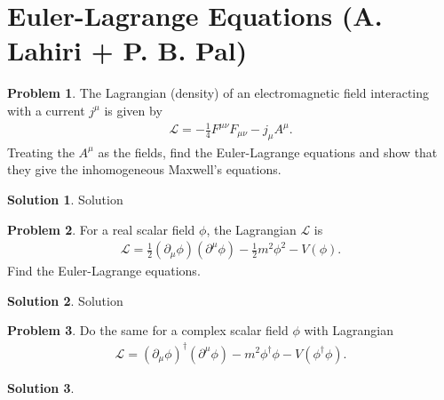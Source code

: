 \documentclass{book}
\numberwithin{equation}{section}
\theoremstyle{definition}
\newtheorem{prob}{Problem}[section]
\newtheorem{sln}{Solution}[section]
\newcommand{\p}{\partial}
\newcommand{\lag}{\mathcal{L}}
\begin{document}
\newpage


\section{Euler-Lagrange Equations (A. Lahiri + P. B. Pal)}

\begin{prob}
	The Lagrangian (density) of an electromagnetic field interacting with a current $j^\mu$ is given by
	\begin{align}
	\lag = -\frac{1}{4}F^{\mu\nu}F_{\mu\nu} - j_\mu A^\mu.
	\end{align}
	Treating the $A^\mu$ as the fields, find the Euler-Lagrange equations and show that they give the inhomogeneous Maxwell's equations.\\
	
	\begin{sln}
		Solution
	\end{sln}
\end{prob}






\newpage

\begin{prob}
	For a real scalar field $\phi$, the Lagrangian $\lag$ is 
	\begin{align}
	\lag = \frac{1}{2}(\p_\mu\phi)(\p^\mu\phi) - \frac{1}{2}m^2\phi^2 - V(\phi).
	\end{align}
	Find the Euler-Lagrange equations.\\
	
	\begin{sln}
		Solution
	\end{sln}
\end{prob}



\newpage




\begin{prob}
	Do the same for a complex scalar field $\phi$ with Lagrangian
	\begin{align}
	\lag = (\p_\mu\phi)^\dagger(\p^\mu\phi) - m^2\phi^\dagger\phi - V(\phi^\dagger\phi).
	\end{align}
	
	
	
	\begin{sln}
		$\,$
	\end{sln}
\end{prob}
\end{document}
